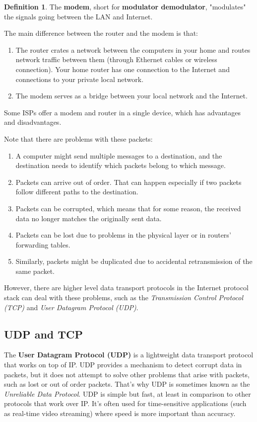 \documentclass[a4paper, 12pt]{report}
\theoremstyle{remark}
\theoremstyle{definition}
\newtheorem{definition}{Definition}[section]
\begin{document}
\begin{definition}
The \textbf{modem}, short for \textbf{modulator demodulator}, "modulates" the signals going between the LAN and Internet. 
\end{definition}

The main difference between the router and the modem is that: 
\begin{enumerate}
    \item The router crates a network between the computers in your home and routes network traffic between them (through Ethernet cables or wireless connection). Your home router has one connection to the Internet and connections to your private local network. 
    \item The modem serves as a bridge between your local network and the Internet. 
\end{enumerate}
Some ISPs offer a modem and router in a single device, which has advantages and disadvantages. 

Note that there are problems with these packets: 
\begin{enumerate}
    \item A computer might send multiple messages to a destination, and the destination needs to identify which packets belong to which message.
    \item Packets can arrive out of order. That can happen especially if two packets follow different paths to the destination.
    \item Packets can be corrupted, which means that for some reason, the received data no longer matches the originally sent data.
    \item Packets can be lost due to problems in the physical layer or in routers' forwarding tables.
    \item Similarly, packets might be duplicated due to accidental retransmission of the same packet.
\end{enumerate}

However, there are higher level data transport protocols in the Internet protocol stack can deal with these problems, such as the \textit{Transmission Control Protocol (TCP)} and \textit{User Datagram Protocol (UDP)}. 

\subsection{UDP and TCP}

The \textbf{User Datagram Protocol (UDP)} is a lightweight data transport protocol that works on top of IP. UDP provides a mechanism to detect corrupt data in packets, but it does not attempt to solve other problems that arise with packets, such as lost or out of order packets. That's why UDP is sometimes known as the \textit{Unreliable Data Protocol}. UDP is simple but fast, at least in comparison to other protocols that work over IP. It's often used for time-sensitive applications (such as real-time video streaming) where speed is more important than accuracy.
\end{document}
